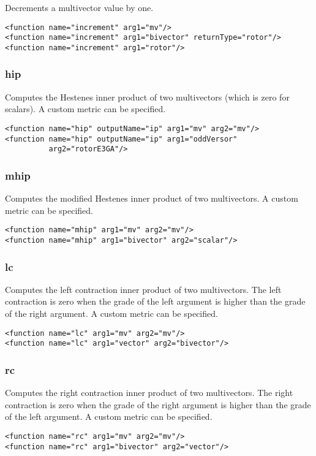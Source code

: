 \documentclass[10pt, a4paper]{article}
\begin{document}
Decrements a multivector value by one.
\begin{verbatim}
<function name="increment" arg1="mv"/>
<function name="increment" arg1="bivector" returnType="rotor"/>
<function name="increment" arg1="rotor"/>
\end{verbatim}

\subsubsection*{hip}

Computes the Hestenes inner product of two multivectors (which is zero for scalars).
A custom metric can be specified.
\begin{verbatim}
<function name="hip" outputName="ip" arg1="mv" arg2="mv"/>
<function name="hip" outputName="ip" arg1="oddVersor"
          arg2="rotorE3GA"/>
\end{verbatim}

\subsubsection*{mhip}

Computes the modified Hestenes inner product of two multivectors.
A custom metric can be specified.
\begin{verbatim}
<function name="mhip" arg1="mv" arg2="mv"/>
<function name="mhip" arg1="bivector" arg2="scalar"/>
\end{verbatim}

\subsubsection*{lc}

Computes the left contraction inner product of two multivectors.
The left contraction is zero when the grade of the left argument
is higher than the grade of the right argument.
A custom metric can be specified.
\begin{verbatim}
<function name="lc" arg1="mv" arg2="mv"/>
<function name="lc" arg1="vector" arg2="bivector"/>
\end{verbatim}

\subsubsection*{rc}

Computes the right contraction inner product of two multivectors.
The right contraction is zero when the grade of the right argument
is higher than the grade of the left argument.
A custom metric can be specified.
\begin{verbatim}
<function name="rc" arg1="mv" arg2="mv"/>
<function name="rc" arg1="bivector" arg2="vector"/>
\end{verbatim}
\end{document}
